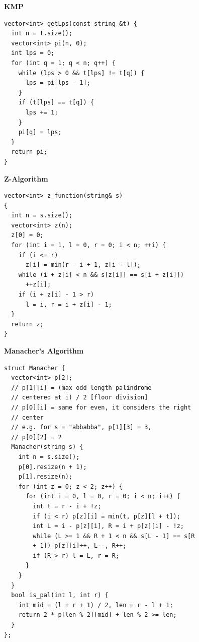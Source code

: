 \textbf{KMP}
\begin{lstlisting}
vector<int> getLps(const string &t) {
  int n = t.size();
  vector<int> pi(n, 0);
  int lps = 0;
  for (int q = 1; q < n; q++) {
    while (lps > 0 && t[lps] != t[q]) {
      lps = pi[lps - 1];
    }
    if (t[lps] == t[q]) {
      lps += 1;
    }
    pi[q] = lps;
  }
  return pi;
}
\end{lstlisting}

\textbf{Z-Algorithm}
\begin{lstlisting}
vector<int> z_function(string& s)
{
  int n = s.size();
  vector<int> z(n);
  z[0] = 0;
  for (int i = 1, l = 0, r = 0; i < n; ++i) {
    if (i <= r)
      z[i] = min(r - i + 1, z[i - l]);
    while (i + z[i] < n && s[z[i]] == s[i + z[i]])
      ++z[i];
    if (i + z[i] - 1 > r)
      l = i, r = i + z[i] - 1;
  }
  return z;
}
\end{lstlisting}

\textbf{Manacher's Algorithm}
\begin{lstlisting}
struct Manacher {
  vector<int> p[2];
  // p[1][i] = (max odd length palindrome
  // centered at i) / 2 [floor division]
  // p[0][i] = same for even, it considers the right
  // center
  // e.g. for s = "abbabba", p[1][3] = 3,
  // p[0][2] = 2
  Manacher(string s) {
    int n = s.size();
    p[0].resize(n + 1);
    p[1].resize(n);
    for (int z = 0; z < 2; z++) {
      for (int i = 0, l = 0, r = 0; i < n; i++) {
        int t = r - i + !z;
        if (i < r) p[z][i] = min(t, p[z][l + t]);
        int L = i - p[z][i], R = i + p[z][i] - !z;
        while (L >= 1 && R + 1 < n && s[L - 1] == s[R
        + 1]) p[z][i]++, L--, R++;
        if (R > r) l = L, r = R;
      }
    }
  }
  bool is_pal(int l, int r) {
    int mid = (l + r + 1) / 2, len = r - l + 1;
    return 2 * p[len % 2][mid] + len % 2 >= len;
  }
};
\end{lstlisting}

\switchcolumn

